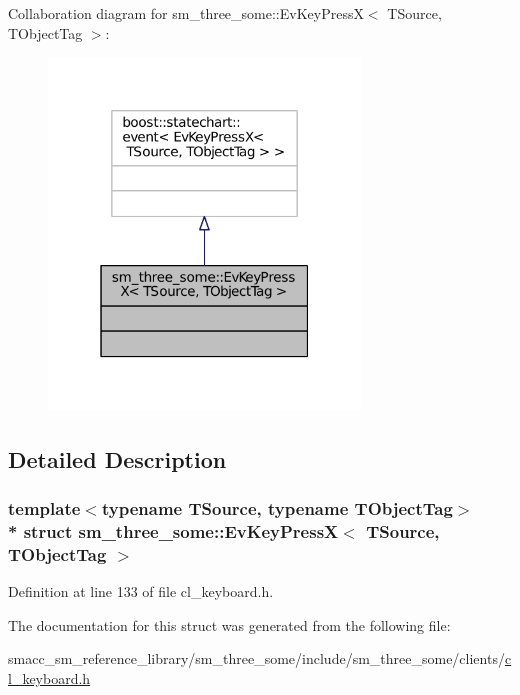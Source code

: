 Collaboration diagram for sm\+\_\+three\+\_\+some\+:\+:Ev\+Key\+PressX$<$ T\+Source, T\+Object\+Tag $>$\+:
\nopagebreak
\begin{figure}[H]
\begin{center}
\leavevmode
\includegraphics[width=235pt]{structsm__three__some_1_1EvKeyPressX__coll__graph}
\end{center}
\end{figure}


\subsection{Detailed Description}
\subsubsection*{template$<$typename T\+Source, typename T\+Object\+Tag$>$\\*
struct sm\+\_\+three\+\_\+some\+::\+Ev\+Key\+Press\+X$<$ T\+Source, T\+Object\+Tag $>$}



Definition at line 133 of file cl\+\_\+keyboard.\+h.



The documentation for this struct was generated from the following file\+:\begin{DoxyCompactItemize}
\item 
smacc\+\_\+sm\+\_\+reference\+\_\+library/sm\+\_\+three\+\_\+some/include/sm\+\_\+three\+\_\+some/clients/\hyperlink{cl__keyboard_8h}{cl\+\_\+keyboard.\+h}\end{DoxyCompactItemize}
